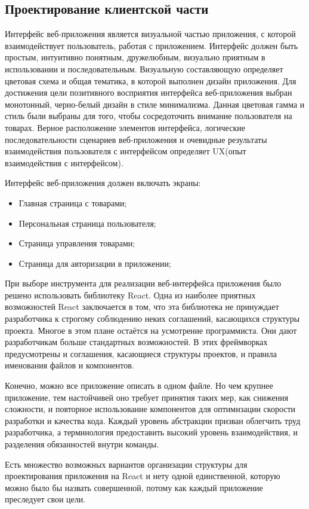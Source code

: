 \subsection{Проектирование клиентской части}
Интерфейс веб-приложения является визуальной частью приложения, с которой взаимодействует пользователь, работая с приложением.
Интерфейс должен быть простым, интуитивно понятным, дружелюбным, визуально приятным в использовании и последовательным. Визуальную составляющую определяет цветовая схема и общая тематика, в которой выполнен дизайн приложения.
Для достижения цели позитивного восприятия интерфейса веб-приложения выбран монотонный, черно-белый дизайн в стиле минимализма.
Данная цветовая гамма и стиль были выбраны для того, чтобы сосредоточить внимание пользователя на товарах.
Верное расположение элементов интерфейса, логические последовательности сценариев веб-приложения и очевидные результаты взаимодействия пользователя с интерфейсом определяет UX(опыт взаимодействия с интерфейсом).

Интерфейс веб-приложения должен включать экраны:
\begin{itemize}
    \item Главная страница с товарами;
    \item Персональная страница пользователя;
    \item Страница управления товарами;
    \item Страница для авторизации в приложении;
\end{itemize}

При выборе инструмента для реализации веб-интерфейса приложения было решено использовать библиотеку React.
Одна из наиболее приятных возможностей React заключается в том, что эта библиотека не принуждает разработчика к строгому соблюдению неких соглашений, касающихся структуры проекта.
Многое в этом плане остаётся на усмотрение программиста.
Они дают разработчикам больше стандартных возможностей.
В этих фреймворках предусмотрены и соглашения, касающиеся структуры проектов, и правила именования файлов и компонентов.

Конечно, можно все приложение описать в одном файле.
Но чем крупнее приложение, тем настойчивей оно требует принятия таких мер, как снижения сложности, и повторное использование компонентов для оптимизации скорости разработки и качества кода.
Каждый уровень абстракции призван облегчить труд разработчика, а терминология предоставить высокий уровень взаимодействия, и разделения обязанностей внутри команды.

Есть множество возможных вариантов организации структуры для проектирования приложения на React и нету одной единственной, которую можно было бы назвать совершенной, потому как каждый приложение преследует свои цели.

